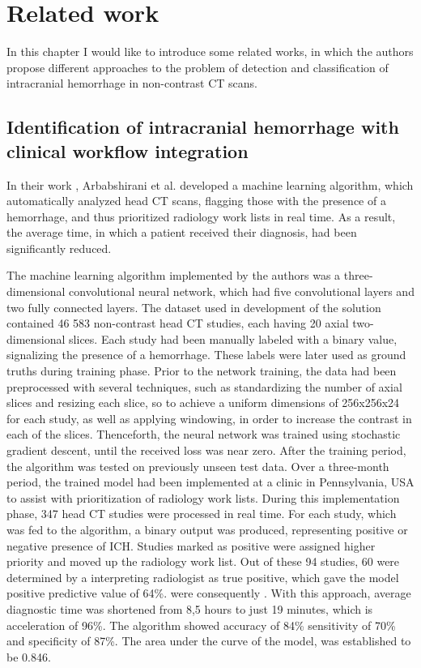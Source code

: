 \chapter{Related work}
In this chapter I would like to introduce some related works, in which the authors propose different approaches to the problem of detection and classification of intracranial hemorrhage in non-contrast CT scans.

\section{Identification of intracranial hemorrhage with clinical workflow integration}
 
In their work \cite{relatedWork1}, Arbabshirani et al. developed a machine learning algorithm, which automatically analyzed head CT scans, flagging those with the presence of a hemorrhage, and thus prioritized radiology work lists in real time. As a result, the average time, in which a patient received their diagnosis, had been significantly reduced.  

The machine learning algorithm implemented by the authors was a three-dimensional convolutional neural network, which had five convolutional layers and two fully connected layers. The dataset used in development of the solution contained 46 583 non-contrast head CT studies, each having 20 axial two-dimensional slices. Each study had been manually labeled with a binary value, signalizing the presence of a hemorrhage. These labels were later used as ground truths during training phase. Prior to the network training, the data had been preprocessed with several techniques, such as standardizing the number of axial slices and resizing each slice, so to achieve a uniform dimensions of 256x256x24 for each study, as well as applying windowing, in order to increase the contrast in each of the slices. Thenceforth, the neural network was trained using stochastic gradient descent, until the received loss was near zero. After the training period, the algorithm was tested on previously unseen test data.
Over a three-month period, the trained model had been implemented at a clinic in Pennsylvania, USA to assist with prioritization of radiology work lists. During this implementation phase, 347 head CT studies were processed in real time. For each study, which was fed to the algorithm, a binary output was produced, representing positive or negative presence of ICH. Studies marked as positive were assigned higher priority and moved up the radiology work list. Out of these 94 studies, 60 were determined by a interpreting radiologist as true positive, which gave the model positive predictive value of 64\%. were consequently . With this approach, average diagnostic time was shortened from 8,5 hours to just 19 minutes, which is acceleration of 96\%. The algorithm showed accuracy of 84\% sensitivity of 70\%  and specificity of 87\%. The area under the curve of the model, was established to be 0.846.


